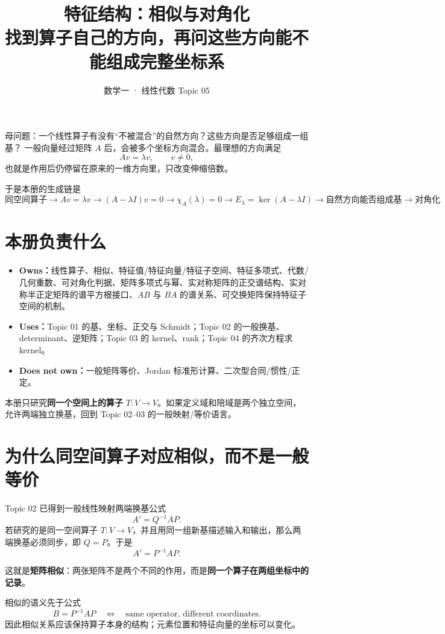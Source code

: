 \documentclass[11pt,a4paper]{ctexart}
\title{\vspace{-1.1cm}\textbf{特征结构：相似与对角化}\\[0.4em]
\large 找到算子自己的方向，再问这些方向能不能组成完整坐标系}
\author{数学一 · 线性代数 Topic 05}
\date{}
\newcommand{\kw}[1]{\textbf{\color{deep}#1}}
\begin{document}
\maketitle

\begin{corebox}{母问题：一个线性算子有没有“不被混合”的自然方向？这些方向是否足够组成一组基？}
一般向量经过矩阵 $A$ 后，会被多个坐标方向混合。最理想的方向满足
\[
Av=\lambda v,
\qquad v\neq0,
\]
也就是作用后仍停留在原来的一维方向里，只改变伸缩倍数。

于是本册的生成链是
\[
\boxed{
\text{同空间算子}
\to Av=\lambda v
\to (A-\lambda I)v=0
\to \chi_A(\lambda)=0
\to E_\lambda=\ker(A-\lambda I)
\to \text{自然方向能否组成基}
\to \text{对角化}
}
\]
\end{corebox}

\section{本册负责什么}

\begin{itemize}
  \item \kw{Owns：}线性算子、相似、特征值/特征向量/特征子空间、特征多项式、代数/几何重数、可对角化判据、矩阵多项式与幂、实对称矩阵的正交谱结构、实对称半正定矩阵的谱平方根接口、$AB$ 与 $BA$ 的谱关系、可交换矩阵保持特征子空间的机制。
  \item \kw{Uses：}Topic 01 的基、坐标、正交与 Schmidt；Topic 02 的一般换基、determinant、逆矩阵；Topic 03 的 kernel、rank；Topic 04 的齐次方程求 kernel。
  \item \kw{Does not own：}一般矩阵等价、Jordan 标准形计算、二次型合同/惯性/正定。
\end{itemize}

本册只研究\kw{同一个空间上的算子} $T:V\to V$。如果定义域和陪域是两个独立空间，允许两端独立换基，回到 Topic 02--03 的一般映射/等价语言。

\section{为什么同空间算子对应相似，而不是一般等价}

Topic 02 已得到一般线性映射两端换基公式
\[
A'=Q^{-1}AP.
\]
若研究的是同一空间算子 $T:V\to V$，并且用同一组新基描述输入和输出，那么两端换基必须同步，即 $Q=P$。于是
\[
\boxed{A'=P^{-1}AP.}
\]

这就是\kw{矩阵相似}：两张矩阵不是两个不同的作用，而是\kw{同一个算子在两组坐标中的记录}。

\begin{corebox}{相似的语义先于公式}
\[
\boxed{B=P^{-1}AP
\quad\Longleftrightarrow\quad
\text{same operator, different coordinates}.}
\]
因此相似关系应该保持算子本身的结构；元素位置和特征向量的坐标可以变化。
\end{corebox}
\end{document}
